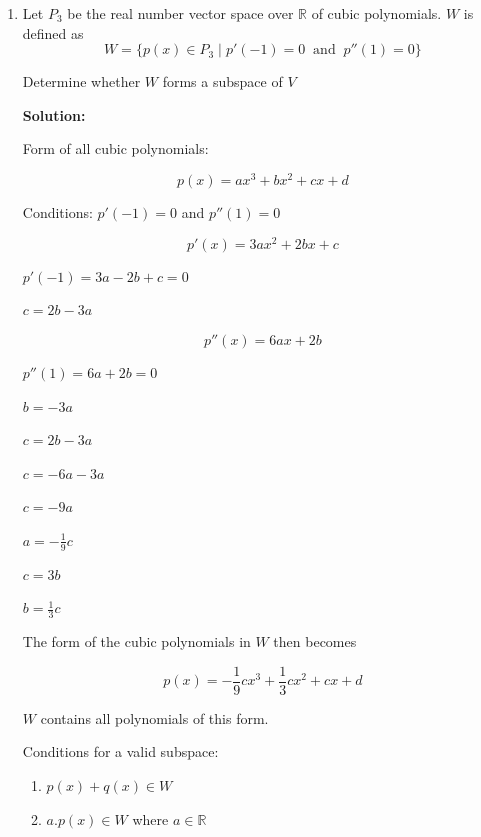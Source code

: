 \documentclass[a4paper, 11pt]{article}
\begin{document}
\begin{enumerate}
\item Let $P_3$ be the real number vector space over $\mathbb R$ of cubic polynomials. $W$ is defined as \[
W = \{p(x) \in P_3 \;|\; p'(-1) = 0 \;\; \text{and} \;\; p''(1) = 0\}
\]

Determine whether $W$ forms a subspace of $V$

\textbf{Solution:}

Form of all cubic polynomials:

\begin{equation}
	p(x) = ax^3 + bx^2 + cx + d
\end{equation}

Conditions: $p'(-1) = 0$ and $p''(1) = 0$

\begin{equation}
	p'(x) = 3ax^2 + 2bx + c
\end{equation}

\begin{center}
	$p'(-1) = 3a -2b + c = 0$

	$c = 2b - 3a$
\end{center}

\begin{equation}
	p''(x) = 6ax + 2b
\end{equation}

\begin{center}
	$p''(1) = 6a + 2b = 0$

	$b = -3a$

	$c = 2b - 3a$

	$c = -6a - 3a$

	$c = -9a$

	$a = -\frac{1}{9}c$

	$c = 3b$

	$b = \frac{1}{3}c$

\end{center}

The form of the cubic polynomials in $W$ then becomes

\begin{equation}
	p(x) = -\frac{1}{9}cx^3 + \frac{1}{3}cx^2 + cx + d
\end{equation}

$W$ contains all polynomials of this form.

Conditions for a valid subspace: 
\begin{enumerate}
	\item $p(x) + q(x) \in W$
	\item $a.p(x) \in W$ where $a \in \mathbb{R}$
\end{enumerate}


\end{enumerate}
\end{document}
